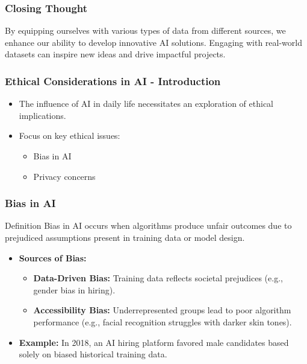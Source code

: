 \documentclass[aspectratio=169]{beamer}
\begin{document}
\begin{frame}[fragile]
    \frametitle{Closing Thought}
    By equipping ourselves with various types of data from different sources, we enhance our ability to develop innovative AI solutions. Engaging with real-world datasets can inspire new ideas and drive impactful projects.
\end{frame}

\begin{frame}[fragile]
    \frametitle{Ethical Considerations in AI - Introduction}
    \begin{itemize}
        \item The influence of AI in daily life necessitates an exploration of ethical implications.
        \item Focus on key ethical issues: 
        \begin{itemize}
            \item Bias in AI
            \item Privacy concerns
        \end{itemize}
    \end{itemize}
\end{frame}

\begin{frame}[fragile]
    \frametitle{Bias in AI}
    \begin{block}{Definition}
        Bias in AI occurs when algorithms produce unfair outcomes due to prejudiced assumptions present in training data or model design.
    \end{block}
    
    \begin{itemize}
        \item \textbf{Sources of Bias:}
        \begin{itemize}
            \item \textbf{Data-Driven Bias:} Training data reflects societal prejudices (e.g., gender bias in hiring).
            \item \textbf{Accessibility Bias:} Underrepresented groups lead to poor algorithm performance (e.g., facial recognition struggles with darker skin tones).
        \end{itemize}
        \item \textbf{Example:} In 2018, an AI hiring platform favored male candidates based solely on biased historical training data.
    \end{itemize}
\end{frame}
\end{document}
